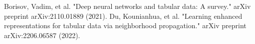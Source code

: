 \begin{thebibliography}{99} %
%	
	 Borisov, Vadim, et al. "Deep neural networks and tabular data: A survey." arXiv preprint arXiv:2110.01889 (2021).
%	
	 Du, Kounianhua, et al. "Learning enhanced representations for tabular data via neighborhood propagation." arXiv preprint arXiv:2206.06587 (2022).
\end{thebibliography}

